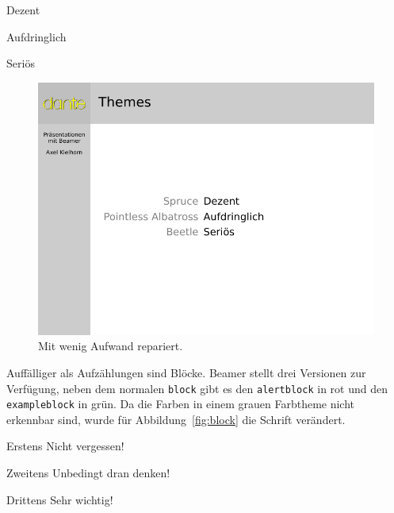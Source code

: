 \begin{lfgwcode}{}
\begin{description}
  \item[Spruce]
    Dezent
  \item[Pointless Albatross]
    Aufdringlich
  \item[Beetle]
    Seriös
\end{description}
\end{lfgwcode}

\begin{figure}
  \includegraphics[width=\textwidth]{beamer-aufz2}
  \caption{Mit wenig Aufwand repariert.}
  \label{fig:aufz2}
\end{figure}

Auffälliger als Aufzählungen sind Blöcke. Beamer stellt drei Versionen zur
Verfügung, neben dem normalen \texttt{block} gibt es den \texttt{alertblock}
in rot und den \texttt{exampleblock} in grün. Da die Farben in einem grauen 
Farbtheme nicht erkennbar sind, wurde für Abbildung~\ref{fig:block} die 
Schrift verändert.

\begin{lfgwcode}{}
\end{lfgwcode}

\begin{lfgwcode}{}
\begin{block}{Erstens}
    Nicht vergessen!
\end{block}
\begin{alertblock}{Zweitens}
    Unbedingt dran denken!
\end{alertblock}
\begin{exampleblock}{Drittens}
    Sehr wichtig!
\end{exampleblock}
\end{lfgwcode}

